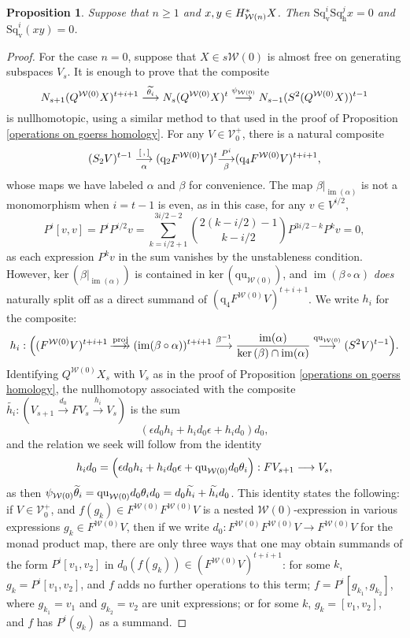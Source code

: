 \documentclass[11pt]{amsart} \renewcommand{\baselinestretch}{1.2}
\theoremstyle{plain}
\newtheorem{prop}[thm]{Proposition}
\numberwithin{equation}{section} %
\theoremstyle{plain}
\newtheorem{prop}[thm]{Proposition}
\numberwithin{equation}{chapter} %
\renewcommand{\ker}{\mathrm{ker}\,}
\DeclareMathOperator{\im}{im}
\renewcommand{\to}{\longrightarrow}
\newcommand{\calV}{\mathcal{V}}
\newcommand{\calw}{\mathcal{W}}
\newcommand{\vect}[2]{\calV^{#1}_{#2}}
\newcommand{\quadratic}{\mathrm{qu}}
\newcommand{\quadgrad}[1]{\mathrm{q}_{#1}}
\newcommand{\epi}{{\,\makebox[0cm][l]{\ensuremath\to}\to{}}}
\newcommand{\mono}{{\to}}
\newcommand{\uver}{^\mathrm{v}}
\newcommand{\dver}{_\mathrm{v}}
\newcommand{\dhor}{_\mathrm{h}}
\newcommand{\Sqh}{\mathrm{Sq}\dhor}
\newcommand{\Sqv}{\mathrm{Sq}\dver}
\newcommand{\deltav}{\delta\uver}
\begin{document}
\begin{Cohomology Operations for W and U}
\begin{prop}
Suppose that $n\geq1$ and $x,y\in H^*_{\smash{\calw(n)}}X$. Then $\Sqv^{i}\Sqh^{j}x=0$ and $\Sqv^i(xy)=0$.
\end{prop}
\begin{proof}
For the case $n=0$, suppose that $X\in s\calw(0)$ is almost free on generating subspaces $V_s$. It is enough to prove that the composite
\[N_{s+1}(Q^{\calw(0)}X)^{t+i+1}
\overset{\smash{\widetilde{\theta_i}}}{\to}
N_s(Q^{\calw(0)}X)^{t}
\overset{{\psi_{\calw(0)}}}{\to}
N_{s-1}(S^2(Q^{\calw(0)}X))^{t-1}
\]
is nullhomotopic, using a similar method to that used in the proof of Proposition \ref{operations on goerss homology}. For any $V\in \vect{+}{0}$, there is a natural composite
\[(S_2V)^{t-1}\underset{\smash{\alpha}}{\overset{[\,,\,]}{\to}} (\quadgrad{2}F^{\calw(0)}V)^{t}\underset{\smash{\beta}}{\overset{P^i}{\mono}} (\quadgrad{4}F^{\calw(0)}V)^{t+i+1},\]
whose maps we have labeled $\alpha$ and $\beta$ for convenience.
The map $\beta|_{\im(\alpha)}$ is not a monomorphism when $i=t-1$ is even, as in this case, for any $v\in V^{i/2}$,
\[P^i[v,v]=P^{i}P^{i/2}v=\textstyle\sum_{k=i/2+1}^{3i/2-2}\binom{2(k-i/2)-1}{ k-i/2}P^{3i/2-k}P^kv=0,\]
as each expression $P^kv$ in the sum vanishes by the unstableness condition.
However, $\ker(\beta|_{\im(\alpha)})$ is contained in $\ker(\quadratic_{\calw(0)})$, 
and $\im(\beta\circ\alpha)$ \emph{does} naturally split off as a direct summand of $(\quadgrad{4}F^{\calw(0)}V)^{t+i+1}$.
 We write $h_i$ for the composite:
\[h_{i}:\Bigl((F^{\calw(0)}V)^{t+i+1}\overset{\textup{proj}}{\epi}
(\im(\beta\circ\alpha))^{t+i+1}\overset{\beta^{-1}}{\to}\frac{\im(\alpha)}{\ker(\beta)\cap\im(\alpha)}\overset{\quadratic_{\calw(0)}}{\to}(S^2V)^{t-1}\Bigr).\]
Identifying $Q^{\calw(0)}X_s$ with $V_s$ as in the proof of Proposition \ref{operations on goerss homology}, the nullhomotopy associated with the composite $\widetilde{h_i}:(V_{s+1}\overset{d_0}{\to}FV_s\overset{h_i}{\to}V_s)$ is the sum
\[(\epsilon d_0h_i+h_id_0\epsilon+h_id_0)d_0,\]
and the relation we seek will follow from the identity
\[h_id_0=\Bigl(\epsilon d_0h_i+h_id_0\epsilon+\quadratic_{\calw(0)} d_0\theta_i\Bigr):FV_{s+1}\to V_s,\]
as then $\psi_{\calw(0)}\smash{\widetilde{\theta}_i}=\quadratic_{\calw(0)} d_0\theta_id_0=d_0\widetilde{h_i}+\widetilde{h_i}d_0$. This identity states the following: if $V\in\vect{+}{0}$, and $f(g_k)\in F^{\calw(0)}F^{\calw(0)}V$ is a nested $\calw(0)$-expression in various expressions $g_k\in F^{\calw(0)}V$, then if we write $d_0:F^{\calw(0)}F^{\calw(0)}V\to F^{\calw(0)}V$ for the monad product map, there are only three ways that one may obtain summands of the form $P^i[v_1,v_2]$ in $d_0(f(g_k))\in (F^{\calw(0)}V)^{t+i+1}$: for some $k$, $g_k=P^i[v_1,v_2]$, and $f $ adds no further operations to this term; $f=P^i[g_{k_1},g_{k_2}]$, where $g_{k_1}=v_1$ and $g_{k_2}=v_2$ are unit expressions; or for some $k$, $g_k=[v_1,v_2]$, and  $f$ has $P^i(g_k)$ as a summand.


\end{proof}
\end{Cohomology Operations for W and U}
\end{document}
